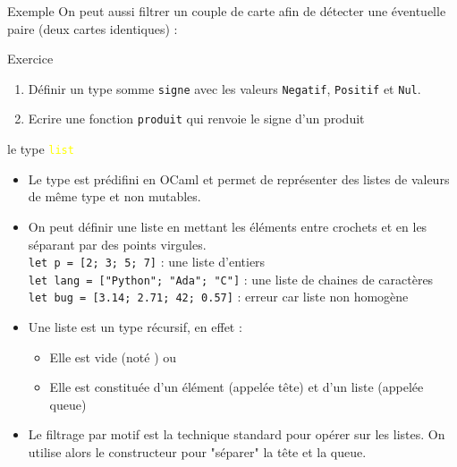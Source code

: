 \documentclass[10pt]{beamer}
\begin{document}
\begin{frame}{\Ctitle}{\stitle}
	\begin{exampleblock}{Exemple}
		On peut aussi filtrer un couple de carte afin de détecter une éventuelle paire (deux cartes identiques) :
	\end{exampleblock}
\end{frame}


\begin{frame}{\Ctitle}{\stitle}
	\begin{exampleblock}{Exercice}
		\begin{enumerate}
			\item<1-> Définir un type somme {\tt signe} avec les valeurs {\tt Negatif}, {\tt Positif} et {\tt Nul}.
			\onslide<2-> 
			\item<3-> Ecrire une fonction {\tt produit} qui renvoie le signe d'un produit 
		\onslide<4-> 
		\end{enumerate}
	\end{exampleblock}
\end{frame}

\begin{frame}{\Ctitle}{\stitle}
	\begin{block}{le type \textcolor{yellow}{\tt list}}
		\begin{itemize}
			\item<1-> Le type  est prédifini en OCaml et permet de représenter des listes de valeurs \textcolor{BrickRed}{de même type} et \textcolor{BrickRed}{non mutables}.
			\item<2-> On peut définir une liste en mettant les éléments entre crochets et en les séparant par des points virgules.\\
			\onslide<3-> \texttt{let p = [2; 3; 5; 7]} : une liste d'entiers \\
			\onslide<4-> \texttt{let lang = ["Python"; "Ada"; "C"]} : une liste de chaines de caractères \\
			\onslide<5-> \texttt{let bug = [3.14; 2.71; 42; 0.57]} : erreur car liste non homogène
			\item<6-> Une liste est un type récursif, en effet :
			\begin{itemize}
				\item<7-> Elle est vide (noté \kw{[]}) ou
				\item<8-> Elle est constituée d'un élément (appelée tête) et d'un liste (appelée queue)
			\end{itemize}
			\item<9-> Le filtrage par motif est la technique standard pour opérer sur les listes. On utilise alors le constructeur \kw{::} pour "séparer" la tête et la queue.
		\end{itemize}
	\end{block}
\end{frame}
\end{document}
